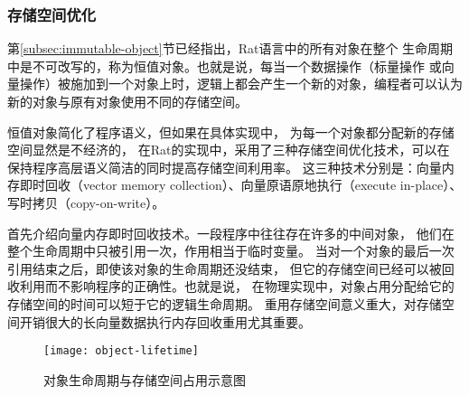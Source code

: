 \subsubsection{存储空间优化}
第\ref{subsec:immutable-object}节已经指出，Rat语言中的所有对象在整个
生命周期中是不可改写的，称为恒值对象。也就是说，每当一个数据操作（标量操作
或向量操作）被施加到一个对象上时，逻辑上都会产生一个新的对象，编程者可以认为
新的对象与原有对象使用不同的存储空间。

恒值对象简化了程序语义，但如果在具体实现中，
为每一个对象都分配新的存储空间显然是不经济的，
在Rat的实现中，采用了三种存储空间优化技术，可以在
保持程序高层语义简洁的同时提高存储空间利用率。
这三种技术分别是：向量内存即时回收（vector memory collection）、向量原语原地执行（execute in-place）、
写时拷贝（copy-on-write）。

首先介绍向量内存即时回收技术。一段程序中往往存在许多的中间对象，
他们在整个生命周期中只被引用一次，作用相当于临时变量。
当对一个对象的最后一次引用结束之后，即使该对象的生命周期还没结束，
但它的存储空间已经可以被回收利用而不影响程序的正确性。也就是说，
在物理实现中，对象占用分配给它的存储空间的时间可以短于它的逻辑生命周期。
重用存储空间意义重大，对存储空间开销很大的长向量数据执行内存回收重用尤其重要。
\begin{quotation}
\end{quotation}
\begin{figure}
  \centering
  \texttt{[image: object-lifetime]}
  \caption{对象生命周期与存储空间占用示意图}
  \label{fig:object-lifetime}
\end{figure}

